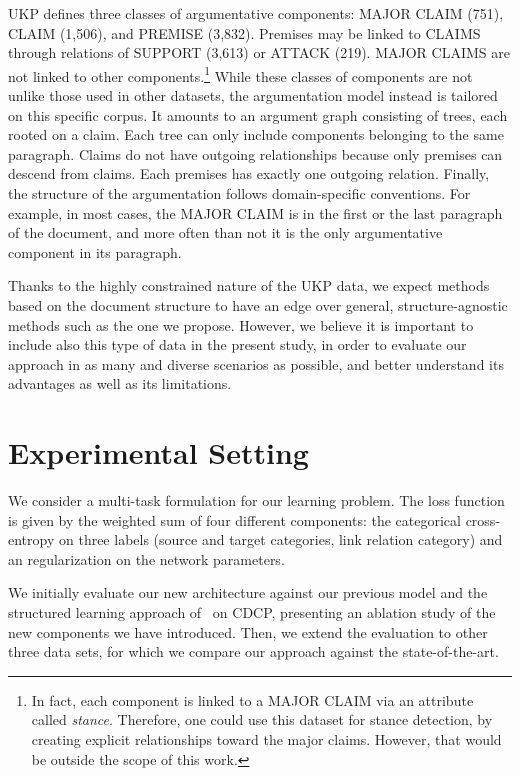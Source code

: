\documentclass[journal]{IEEEtran}
\begin{document}
UKP defines three classes of argumentative components: MAJOR CLAIM (751), CLAIM (1,506), and PREMISE (3,832). Premises may be linked to CLAIMS through relations of SUPPORT (3,613) or ATTACK (219). MAJOR CLAIMS are not linked to other components.\footnote{In fact, each component is linked to a MAJOR CLAIM via an attribute called \emph{stance}. Therefore, one could use this dataset for stance detection, by creating explicit relationships toward the major claims. However, that would be outside the scope of this work.}
While these classes of components are not unlike those used in other datasets, the argumentation model instead is tailored on this specific corpus. It amounts to an argument graph consisting of trees, each rooted on a claim.
Each tree can only include components belonging to the same paragraph.
Claims do not have outgoing relationships because only premises can descend from claims. Each premises has exactly one outgoing relation.
Finally, the structure of the argumentation follows domain-specific conventions. For example, in most cases, the MAJOR CLAIM is in the first or the last paragraph of the document, and more often than not it is the only argumentative component in its paragraph.




Thanks to the highly constrained nature of the UKP data, we expect methods based on the document structure to have an edge over general, structure-agnostic methods such as the one we propose. However, we believe it is important to include also this type of data in the present study, in order to 
evaluate our approach in as many and diverse scenarios as possible, and better understand its advantages as well as its limitations.

 
\section{Experimental Setting}
\label{sec:method}


We consider a multi-task formulation for our learning problem. The loss function is given by the weighted sum of four different components: the categorical cross-entropy on three labels (source and target categories, link relation category) and an  regularization on the network parameters.


We initially evaluate our new architecture against our previous model and the structured learning approach of~\cite{DBLP:conf/acl/NiculaePC17} on CDCP, presenting an ablation study of the new components we have introduced.
Then, we extend the evaluation to other three data sets, for which we compare our approach against the state-of-the-art. 
\end{document}
